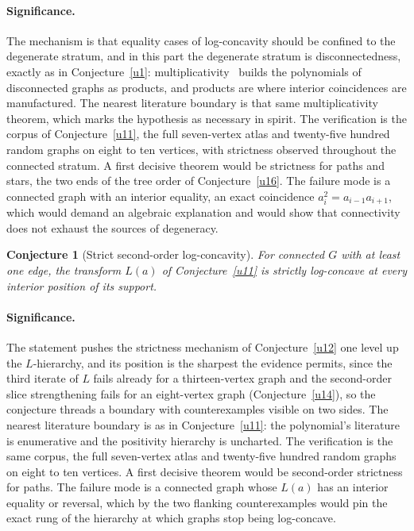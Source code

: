 \documentclass[11pt]{article}
\newtheorem{conjecture}{Conjecture}
\theoremstyle{definition}
\begin{document}
\paragraph{Significance.}
The mechanism is that equality cases of log-concavity should be confined to the degenerate stratum, and in this part the degenerate stratum is disconnectedness, exactly as in Conjecture~\ref{u1}: multiplicativity~\cite{Ros22} builds the polynomials of disconnected graphs as products, and products are where interior coincidences are manufactured.  The nearest literature boundary is that same multiplicativity theorem, which marks the hypothesis as necessary in spirit.  The verification is the corpus of Conjecture~\ref{u11}, the full seven-vertex atlas and twenty-five hundred random graphs on eight to ten vertices, with strictness observed throughout the connected stratum.  A first decisive theorem would be strictness for paths and stars, the two ends of the tree order of Conjecture~\ref{u16}.  The failure mode is a connected graph with an interior equality, an exact coincidence $a_i^2=a_{i-1}a_{i+1}$, which would demand an algebraic explanation and would show that connectivity does not exhaust the sources of degeneracy.


\begin{conjecture}[Strict second-order log-concavity]\label{u13}
For connected $G$ with at least one edge, the transform $L(a)$ of Conjecture~\ref{u11} is strictly log-concave at every interior position of its support.
\end{conjecture}

\paragraph{Significance.}
The statement pushes the strictness mechanism of Conjecture~\ref{u12} one level up the $L$-hierarchy, and its position is the sharpest the evidence permits, since the third iterate of $L$ fails already for a thirteen-vertex graph and the second-order slice strengthening fails for an eight-vertex graph (Conjecture~\ref{u14}), so the conjecture threads a boundary with counterexamples visible on two sides.  The nearest literature boundary is as in Conjecture~\ref{u11}: the polynomial's literature~\cite{Ros22} is enumerative and the positivity hierarchy is uncharted.  The verification is the same corpus, the full seven-vertex atlas and twenty-five hundred random graphs on eight to ten vertices.  A first decisive theorem would be second-order strictness for paths.  The failure mode is a connected graph whose $L(a)$ has an interior equality or reversal, which by the two flanking counterexamples would pin the exact rung of the hierarchy at which graphs stop being log-concave.
\end{document}
